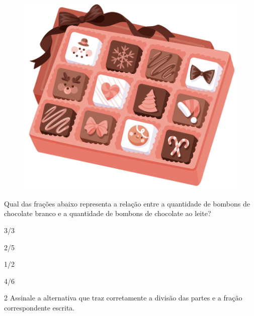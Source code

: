 \begin{figure}[htpb!]
\centering
\includegraphics[width=.75\textwidth]{../ilustracoes/MAT5/SAEB_5ANO_MAT_figura76.png}
\end{figure}

Qual das frações abaixo representa a relação entre a quantidade de
bombons de chocolate branco e a quantidade de bombons de chocolate ao leite?

\begin{minipage}{.5\textwidth}
\begin{escolha}
\item
  3/3
\item
  2/5
\item
  1/2
\item
  4/6
\end{escolha}
\end{minipage}

\pagebreak

\num{2} Assinale a alternativa que traz corretamente a divisão das partes e a fração correspondente escrita.

